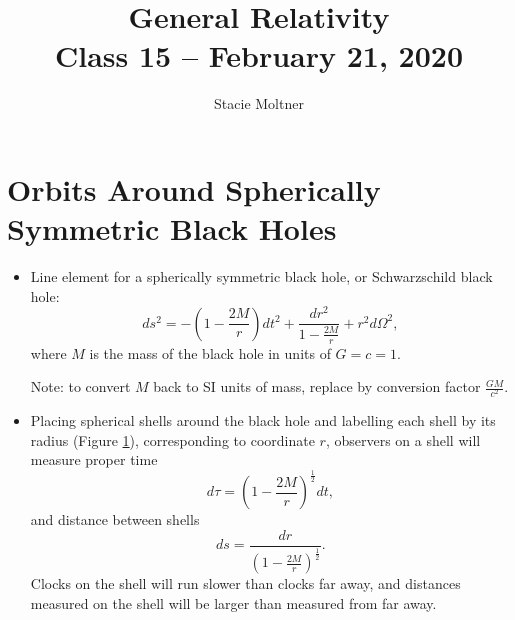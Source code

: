 \documentclass[10pt]{article}
\title{{\Huge General Relativity}\\{\Large{Class 15 -- February 21, 2020}}} %
\author{Stacie Moltner}
\begin{document}
\maketitle
\flushbottom
\newpage
\pagestyle{fancynotes}


\section{Orbits Around Spherically Symmetric Black Holes}\label{sec:orbits}
\begin{itemize}
\item Line element for a spherically symmetric black hole, or Schwarzschild black hole:
\begin{equation}
ds^2 = -\left(1-\dfrac{2M}{r}\right)dt^2 + \dfrac{dr^2}{1-\frac{2M}{r}} + r^2 d\Omega^2,
\end{equation}
where $M$ is the mass of the black hole in units of $G=c=1$.

Note: to convert $M$ back to SI units of mass, replace by conversion factor $\frac{GM}{c^2}$.

\item Placing spherical shells around the black hole and labelling each shell by its radius (Figure \ref{fig:shells}), corresponding to coordinate $r$, observers on a shell will measure proper time
\begin{equation}
d\tau = \left(1-\dfrac{2M}{r}\right)^{\frac{1}{2}} dt,
\end{equation}
and distance between shells
\begin{equation}
ds = \dfrac{dr}{\left(1-\frac{2M}{r}\right)^\frac{1}{2}}.
\end{equation}
Clocks on the shell will run slower than clocks far away, and distances measured on the shell will be larger than measured from far away.

\begin{figure}[h]\label{fig:shells}
\centering
{} %

\begin{tikzpicture}[x=0.75pt,y=0.75pt,yscale=-1,xscale=1]


\end{tikzpicture}
\end{figure}
\end{itemize}
\end{document}
